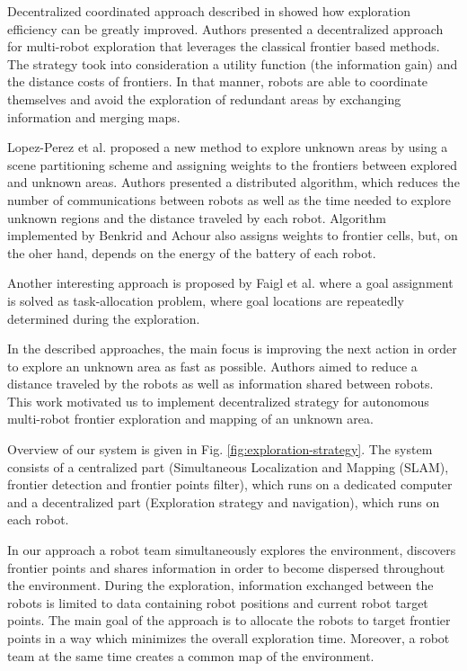 Decentralized coordinated approach described in \cite{Colares2016} showed how exploration efficiency can be greatly improved. Authors presented a decentralized approach for multi-robot exploration that leverages the classical frontier based methods. The strategy took into consideration a utility function (the information gain) and the distance costs of frontiers. In that manner, robots are able to coordinate themselves and avoid the exploration of redundant areas by exchanging information and merging maps.

Lopez-Perez et al. \cite{LopezPerez2018} proposed a new method to explore unknown areas by using a scene partitioning scheme and assigning weights to the frontiers between explored and unknown areas. Authors presented a distributed algorithm, which reduces the number of communications between robots as well as the time needed to explore unknown regions and the distance traveled by each robot. Algorithm implemented by Benkrid and Achour \cite{Benkrid2017} also assigns weights to frontier cells, but, on the oher hand, depends on the energy of the battery of each robot.

Another interesting approach is proposed by Faigl et al. \cite{Faigl2015} where a goal assignment is solved as task-allocation problem, where goal locations are repeatedly determined during the exploration. 

In the described approaches, the main focus is improving the next action in order to explore an unknown area as fast as possible. Authors aimed to reduce a distance traveled by the robots as well as information shared between robots. This work motivated us to implement decentralized strategy for autonomous multi-robot frontier exploration and mapping of an unknown area. 

Overview of our system is given in Fig. \ref{fig:exploration-strategy}. The system consists of a centralized part (Simultaneous Localization and Mapping (SLAM), frontier detection and frontier points filter), which runs on a dedicated computer and a decentralized part (Exploration strategy and navigation), which runs on each robot. 

In our approach a robot team simultaneously explores the environment, discovers frontier points and shares information in order to become dispersed throughout the environment. During the exploration, information exchanged between the robots is limited to data containing robot positions and current robot target points. The main goal of the approach is to allocate the robots to target frontier points in a way which minimizes the overall exploration time. Moreover, a robot team at the same time creates a common map of the environment. 

